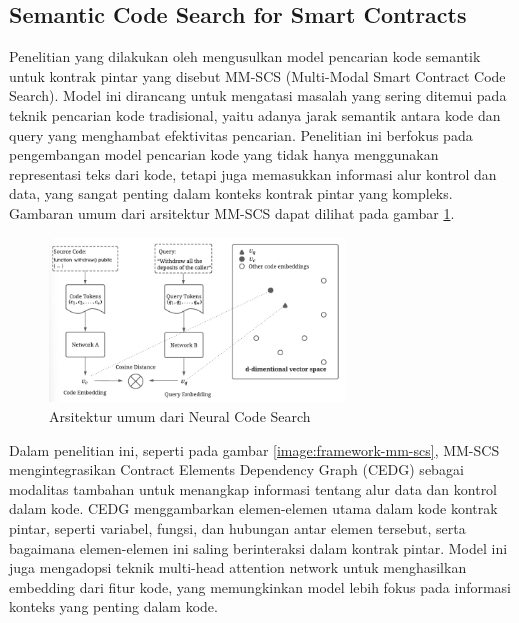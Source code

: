 \subsection{Semantic Code Search for Smart Contracts}
\label{subsec:semantic-code-search}

Penelitian yang dilakukan oleh \cite{shi2021semantic} mengusulkan model pencarian kode semantik untuk kontrak pintar yang disebut MM-SCS (Multi-Modal Smart Contract Code Search). Model ini dirancang untuk mengatasi masalah yang sering ditemui pada teknik pencarian kode tradisional, yaitu adanya jarak semantik antara kode dan query yang menghambat efektivitas pencarian. Penelitian ini berfokus pada pengembangan model pencarian kode yang tidak hanya menggunakan representasi teks dari kode, tetapi juga memasukkan informasi alur kontrol dan data, yang sangat penting dalam konteks kontrak pintar yang kompleks. Gambaran umum dari arsitektur MM-SCS dapat dilihat pada gambar \ref{image:architecture-code-search}.

\begin{figure}[ht]
	\centering
	\includegraphics[width=0.7\textwidth]{resources/chapter-2/architecture-code-search.png}
	\caption{Arsitektur umum dari Neural Code Search \parencite{shi2021semantic}}
	\label{image:architecture-code-search}
\end{figure}

Dalam penelitian ini, seperti pada gambar \ref{image:framework-mm-scs}, MM-SCS mengintegrasikan Contract Elements Dependency Graph (CEDG) sebagai modalitas tambahan untuk menangkap informasi tentang alur data dan kontrol dalam kode. CEDG menggambarkan elemen-elemen utama dalam kode kontrak pintar, seperti variabel, fungsi, dan hubungan antar elemen tersebut, serta bagaimana elemen-elemen ini saling berinteraksi dalam kontrak pintar. Model ini juga mengadopsi teknik multi-head attention network untuk menghasilkan embedding dari fitur kode, yang memungkinkan model lebih fokus pada informasi konteks yang penting dalam kode.

